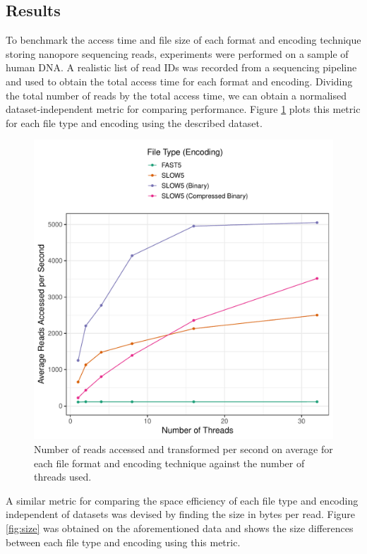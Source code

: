 \subsection{Results}
\label{sec:experi:results}

To benchmark the access time and file size of each format and encoding technique storing nanopore sequencing reads, experiments were performed on a sample of human DNA. A realistic list of read IDs was recorded from a sequencing pipeline and used to obtain the total access time for each format and encoding. Dividing the total number of reads by the total access time, we can obtain a normalised dataset-independent metric for comparing performance. Figure \ref{fig:time} plots this metric for each file type and encoding using the described dataset.

\begin{figure}[h]
    \includegraphics[width=\linewidth]{../../plots/gpgpu_read_time_thread.pdf}
    \caption{Number of reads accessed and transformed per second on average for each file format and encoding technique against the number of threads used.\label{fig:time}}
\end{figure}

A similar metric for comparing the space efficiency of each file type and encoding independent of datasets was devised by finding the size in bytes per read. Figure \ref{fig:size} was obtained on the aforementioned data and shows the size differences between each file type and encoding using this metric.

